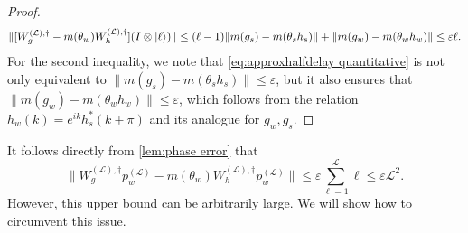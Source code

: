 \documentclass[aps,pra,reprint,superscriptaddress,floatfix,amsmath,amssymb,amsfonts]{revtex4-1}
\newcommand*{\ot}{\otimes}
\begin{document}
\begin{proof}
  \begin{align*}
    \lVert [W_g^{(\mathcal L),\dagger} - m(\theta_w) W_h^{(\mathcal L),\dagger}] (I \ot \ket \ell) \rVert
  \leq (\ell-1) \lVert m(g_s) - m(\theta_s h_s) \rVert + \lVert m(g_w) - m(\theta_w h_w) \rVert
  \leq \varepsilon \ell.
  \end{align*}
  For the second inequality, we note that \cref{eq:approxhalfdelay quantitative} is not only equivalent to $\lVert m(g_s) - m(\theta_s h_s) \rVert \leq\varepsilon$, but it also ensures that $\lVert m(g_w) - m(\theta_w h_w) \rVert\leq\varepsilon$, which follows from the relation $h_w(k) = e^{ik} h_s^*(k+\pi)$ and its analogue for $g_w,g_s$.
\end{proof}

It follows directly from \cref{lem:phase error} that
\begin{equation}\label{eq:phase error}
  \lVert W_g^{(\mathcal L),\dagger} p_w^{(\mathcal L)} - m(\theta_w) W_h^{(\mathcal L),\dagger} p_w^{(\mathcal L)} \rVert
  \leq \varepsilon \sum_{\ell=1}^\mathcal L \ell
  \leq \varepsilon \mathcal L^2.
\end{equation}
However, this upper bound can be arbitrarily large.
We will show how to circumvent this issue.
\end{document}
